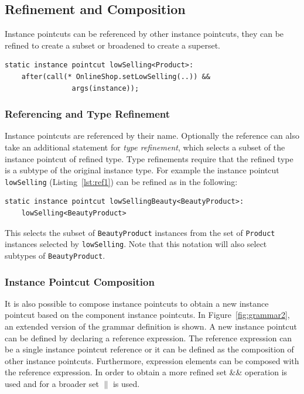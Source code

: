 \documentclass{acm_proc_article-sp}
\begin{document}
\subsection{Refinement and Composition}

Instance pointcuts can be referenced by other instance pointcuts, they can be refined to create a subset or broadened to create a superset. 

\begin{lstlisting}[float=h!, caption={An instance pointcut selecting low-selling products}, label={lst:ref1}]
static instance pointcut lowSelling<Product>: 
	after(call(* OnlineShop.setLowSelling(..)) && 
				args(instance));
\end{lstlisting}

\subsubsection{Referencing and Type Refinement}
Instance pointcuts are referenced by their name. Optionally the reference can also take an additional statement for \emph{type refinement}, which selects a subset of the instance pointcut of refined type. Type refinements require that the refined type is a subtype of the original instance type. For example the instance pointcut \texttt{lowSelling} (Listing~\ref{lst:ref1}) can be refined as in the following:
\begin{lstlisting}[float=h!]
static instance pointcut lowSellingBeauty<BeautyProduct>: 
	lowSelling<BeautyProduct>
\end{lstlisting}

This selects the subset of \texttt{BeautyProduct} instances from the set of \texttt{Product} instances selected by \texttt{lowSelling}. 
Note that this notation will also select subtypes of \texttt{BeautyProduct}. 

\subsubsection{Instance Pointcut Composition}
It is also possible to compose instance pointcuts to obtain a new instance pointcut based on the component instance pointcuts. In Figure~\ref{fig:grammar2}, an extended version of the grammar definition is shown. A new instance pointcut can be defined by declaring a reference expression. The reference expression can be a single instance pointcut reference or it can be defined as the composition of other instance pointcuts.  Furthermore, expression elements can be composed with the reference expression. In order to obtain a more refined set \&\& operation is used and for a broader set $\|$ is used. 
\end{document}
